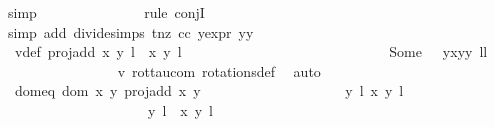 \begin{isabellebody}
{\isacharparenleft}simp{\isacharparenright}\isanewline
\ \ \ \ \ \ \ \ \ \ \ \ \ \ \isamarkupfalse%
{\isacharparenleft}rule\ conjI{\isacharparenright}\isanewline
\ \ \ \ \ \ \ \ \ \ \ \ \ \ \isamarkupfalse%
{\isacharparenleft}simp\ add{\isacharcolon}\ divide{\isacharunderscore}simps\ t{\isacharunderscore}nz\ cc\ y{\isacharunderscore}expr\ {\isacartoucheopen}y{\isacharasterisk}y\ {\isacharequal}\ {}{\isacartoucheclose}{\isacharparenright}{\isacharplus}\isanewline
\ \ \ \ \ \ \ \ \ \ \ \ \isamarkupfalse%
\ \isamarkupfalse%
\ v{}{\isacharunderscore}def{\isacharcolon}\ {\isachardoublequoteopen}proj{\isacharunderscore}add\ {\isacharparenleft}{\isacharparenleft}x{\isacharcomma}\ y{\isacharparenright}{\isacharcomma}\ l{\isacharparenright}\ {\isacharparenleft}{\isasymtau}\ {\isacharparenleft}x{\isacharprime}{\isacharcomma}\ y{\isacharprime}{\isacharparenright}{\isacharcomma}\ l{\isacharprime}\ {\isacharplus}\ {}{\isacharparenright}\ {\isacharequal}\isanewline
\ \ \ \ \ \ \ \ \ \ \ \ \ \ \ \ \ \ \ \ \ \ \ \ \ \ Some\ {\isacharparenleft}{\isasymtau}\ {\isacharparenleft}{\isasymrho}\ {\isacharparenleft}y{\isacharasterisk}x{\isacharprime}{\isacharcomma}y{\isacharasterisk}y{\isacharprime}{\isacharparenright}{\isacharparenright}{\isacharcomma}\ l{\isacharplus}l{\isacharprime}{\isacharplus}{}{\isacharparenright}{\isachardoublequoteclose}\isanewline
\ \ \ \ \ \ \ \ \ \ \ \ \ \ \isamarkupfalse%
\ v{}\ rot{\isacharunderscore}tau{\isacharunderscore}com\ rotations{\isacharunderscore}def\ \isamarkupfalse%
\ auto\isanewline
\ \ \ \ \ \ \ \ \ \ \ \ \isamarkupfalse%
\ dom{\isacharunderscore}eq{\isacharcolon}\ {\isachardoublequoteopen}{\isacharparenleft}dom\ {\isacharparenleft}{\isasymlambda}{\isacharparenleft}x{\isacharcomma}\ y{\isacharparenright}{\isachardot}\ proj{\isacharunderscore}add\ x\ y{\isacharparenright}\ {\isasyminter}\isanewline
\ \ \ \ \ \ \ \ \ \ \ \ \ \ \ \ \ \ {\isacharbraceleft}{\isacharparenleft}{\isacharparenleft}{\isacharparenleft}{}{\isacharcomma}\ y{\isacharparenright}{\isacharcomma}\ l{\isacharparenright}{\isacharcomma}\ {\isacharparenleft}x{\isacharprime}{\isacharcomma}\ y{\isacharprime}{\isacharparenright}{\isacharcomma}\ l{\isacharprime}{\isacharparenright}{\isacharcomma}\isanewline
\ \ \ \ \ \ \ \ \ \ \ \ \ \ \ \ \ \ \ {\isacharparenleft}{\isacharparenleft}{\isacharparenleft}{}{\isacharcomma}\ y{\isacharparenright}{\isacharcomma}\ l{\isacharparenright}{\isacharcomma}\ {\isasymtau}\ {\isacharparenleft}x{\isacharprime}{\isacharcomma}\ y{\isacharprime}{\isacharparenright}{\isacharcomma}\ l{\isacharprime}\ {\isacharplus}\ {}{\isacharparenright}{\isacharbraceright}{\isacharparenright}\ {\isacharequal}\ \isanewline

\end{isabellebody}
